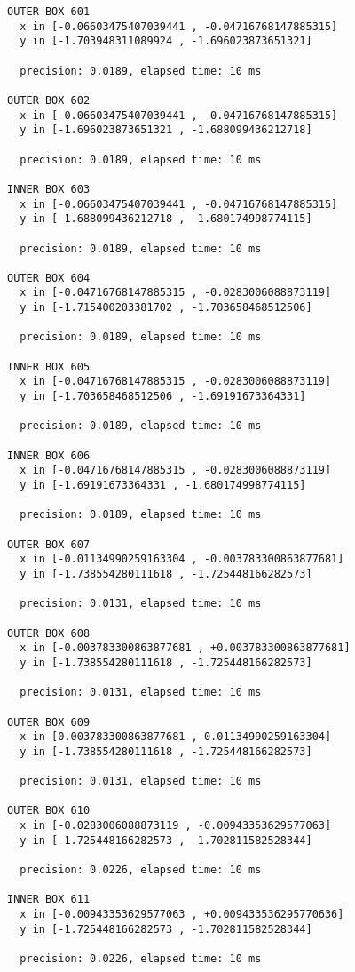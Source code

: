 \begin{verbatim}
OUTER BOX 601
  x in [-0.06603475407039441 , -0.04716768147885315]
  y in [-1.703948311089924 , -1.696023873651321]

  precision: 0.0189, elapsed time: 10 ms

OUTER BOX 602
  x in [-0.06603475407039441 , -0.04716768147885315]
  y in [-1.696023873651321 , -1.688099436212718]

  precision: 0.0189, elapsed time: 10 ms

INNER BOX 603
  x in [-0.06603475407039441 , -0.04716768147885315]
  y in [-1.688099436212718 , -1.680174998774115]

  precision: 0.0189, elapsed time: 10 ms

OUTER BOX 604
  x in [-0.04716768147885315 , -0.0283006088873119]
  y in [-1.715400203381702 , -1.703658468512506]

  precision: 0.0189, elapsed time: 10 ms

INNER BOX 605
  x in [-0.04716768147885315 , -0.0283006088873119]
  y in [-1.703658468512506 , -1.69191673364331]

  precision: 0.0189, elapsed time: 10 ms

INNER BOX 606
  x in [-0.04716768147885315 , -0.0283006088873119]
  y in [-1.69191673364331 , -1.680174998774115]

  precision: 0.0189, elapsed time: 10 ms

OUTER BOX 607
  x in [-0.01134990259163304 , -0.003783300863877681]
  y in [-1.738554280111618 , -1.725448166282573]

  precision: 0.0131, elapsed time: 10 ms

OUTER BOX 608
  x in [-0.003783300863877681 , +0.003783300863877681]
  y in [-1.738554280111618 , -1.725448166282573]

  precision: 0.0131, elapsed time: 10 ms

OUTER BOX 609
  x in [0.003783300863877681 , 0.01134990259163304]
  y in [-1.738554280111618 , -1.725448166282573]

  precision: 0.0131, elapsed time: 10 ms

OUTER BOX 610
  x in [-0.0283006088873119 , -0.00943353629577063]
  y in [-1.725448166282573 , -1.702811582528344]

  precision: 0.0226, elapsed time: 10 ms

INNER BOX 611
  x in [-0.00943353629577063 , +0.009433536295770636]
  y in [-1.725448166282573 , -1.702811582528344]

  precision: 0.0226, elapsed time: 10 ms


\end{verbatim}
